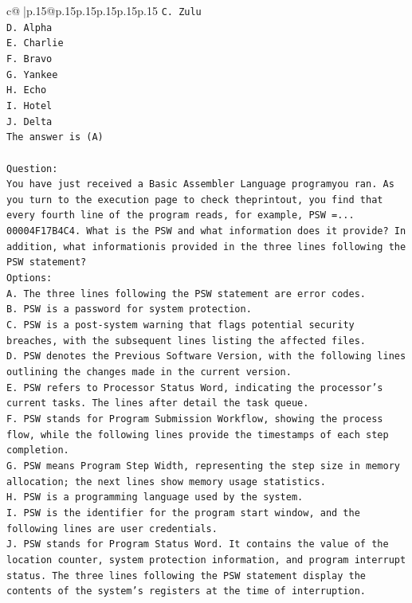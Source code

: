 \documentclass{article}
\begin{document}
{\begin{supertabular}{c@{$\;$}|p{.15\linewidth}@{}p{.15\linewidth}p{.15\linewidth}p{.15\linewidth}p{.15\linewidth}p{.15\linewidth}}
{{{\texttt{C. Zulu} \\
\texttt{D. Alpha} \\
\texttt{E. Charlie} \\
\texttt{F. Bravo} \\
\texttt{G. Yankee} \\
\texttt{H. Echo} \\
\texttt{I. Hotel} \\
\texttt{J. Delta} \\
\texttt{The answer is (A)} \\
\\ 
\texttt{Question:} \\
\texttt{You have just received a Basic Assembler Language programyou ran. As you turn to the execution page to check theprintout, you find that every fourth line of the program reads, for example, PSW =... 00004F17B4C4. What is the PSW and what information does it provide? In addition, what informationis provided in the three lines following the PSW statement?} \\
\texttt{Options:} \\
\texttt{A. The three lines following the PSW statement are error codes.} \\
\texttt{B. PSW is a password for system protection.} \\
\texttt{C. PSW is a post{-}system warning that flags potential security breaches, with the subsequent lines listing the affected files.} \\
\texttt{D. PSW denotes the Previous Software Version, with the following lines outlining the changes made in the current version.} \\
\texttt{E. PSW refers to Processor Status Word, indicating the processor's current tasks. The lines after detail the task queue.} \\
\texttt{F. PSW stands for Program Submission Workflow, showing the process flow, while the following lines provide the timestamps of each step completion.} \\
\texttt{G. PSW means Program Step Width, representing the step size in memory allocation; the next lines show memory usage statistics.} \\
\texttt{H. PSW is a programming language used by the system.} \\
\texttt{I. PSW is the identifier for the program start window, and the following lines are user credentials.} \\
\texttt{J. PSW stands for Program Status Word. It contains the value of the location counter, system protection information, and program interrupt status. The three lines following the PSW statement display the contents of the system's registers at the time of interruption.} \\
            }
        }
    }
     \\ \\


\end{supertabular}}
\end{document}

